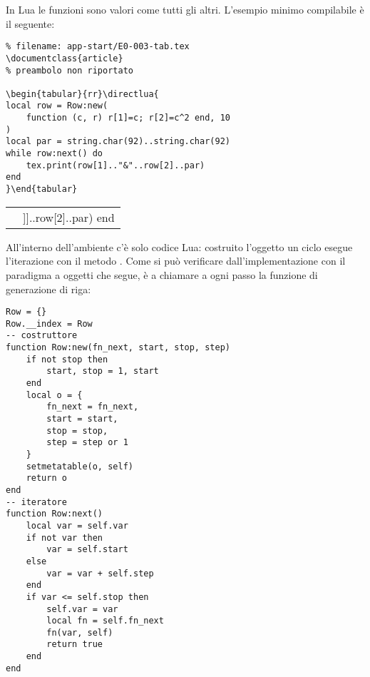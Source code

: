 In Lua le funzioni sono valori come tutti gli altri. L'esempio minimo
compilabile è il seguente:
\begin{tcolorbox}[sidebyside,righthand width=21mm]
\begin{Verbatim}[numbers=none,xleftmargin=0pt]
% !TeX program = LuaLaTeX
% filename: app-start/E0-003-tab.tex
\documentclass{article}
% preambolo non riportato

\begin{tabular}{rr}\directlua{
local row = Row:new(
    function (c, r) r[1]=c; r[2]=c^2 end, 10
)
local par = string.char(92)..string.char(92)
while row:next() do
    tex.print(row[1].."&"..row[2]..par)
end
}\end{tabular}

\end{Verbatim}
\tcblower
\begin{tabular}{rr}
\directlua{
local row = Row:new(function (c, r) r[1]=c; r[2] = c^2 end, 10)
local par = string.char(92)..string.char(92)
while row:next() do
    tex.print(row[1]..[[&]]..row[2]..par)
end
}
\end{tabular}
\end{tcolorbox}

All'interno dell'ambiente  c'è solo codice Lua: costruito l'oggetto
 un ciclo  esegue l'iterazione con il metodo . Come
si può verificare dall'implementazione con il paradigma a oggetti che segue, è
 a chiamare a ogni passo la funzione di generazione di riga:
%
%
%
\begin{Verbatim}
Row = {}
Row.__index = Row
-- costruttore
function Row:new(fn_next, start, stop, step)
    if not stop then
        start, stop = 1, start
    end
    local o = {
        fn_next = fn_next,
        start = start,
        stop = stop,
        step = step or 1
    }
    setmetatable(o, self)
    return o
end
-- iteratore
function Row:next()
    local var = self.var
    if not var then
        var = self.start
    else
        var = var + self.step
    end
    if var <= self.stop then
        self.var = var
        local fn = self.fn_next
        fn(var, self)
        return true
    end
end
\end{Verbatim}

